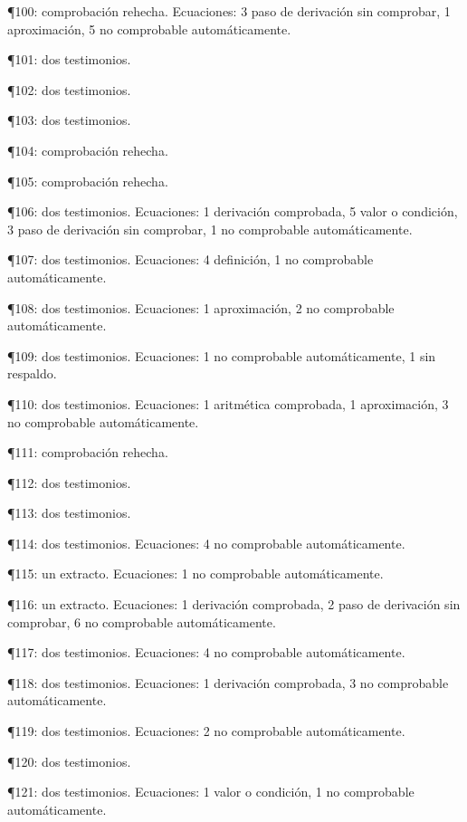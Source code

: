 \documentclass[10pt,openany]{book}
\begin{document}
\noindent ¶100: comprobación rehecha. Ecuaciones: 3 paso de derivación sin comprobar, 1 aproximación, 5 no comprobable automáticamente.\par
\noindent ¶101: dos testimonios.\par
\noindent ¶102: dos testimonios.\par
\noindent ¶103: dos testimonios.\par
\noindent ¶104: comprobación rehecha.\par
\noindent ¶105: comprobación rehecha.\par
\noindent ¶106: dos testimonios. Ecuaciones: 1 derivación comprobada, 5 valor o condición, 3 paso de derivación sin comprobar, 1 no comprobable automáticamente.\par
\noindent ¶107: dos testimonios. Ecuaciones: 4 definición, 1 no comprobable automáticamente.\par
\noindent ¶108: dos testimonios. Ecuaciones: 1 aproximación, 2 no comprobable automáticamente.\par
\noindent ¶109: dos testimonios. Ecuaciones: 1 no comprobable automáticamente, 1 sin respaldo.\par
\noindent ¶110: dos testimonios. Ecuaciones: 1 aritmética comprobada, 1 aproximación, 3 no comprobable automáticamente.\par
\noindent ¶111: comprobación rehecha.\par
\noindent ¶112: dos testimonios.\par
\noindent ¶113: dos testimonios.\par
\noindent ¶114: dos testimonios. Ecuaciones: 4 no comprobable automáticamente.\par
\noindent ¶115: un extracto. Ecuaciones: 1 no comprobable automáticamente.\par
\noindent ¶116: un extracto. Ecuaciones: 1 derivación comprobada, 2 paso de derivación sin comprobar, 6 no comprobable automáticamente.\par
\noindent ¶117: dos testimonios. Ecuaciones: 4 no comprobable automáticamente.\par
\noindent ¶118: dos testimonios. Ecuaciones: 1 derivación comprobada, 3 no comprobable automáticamente.\par
\noindent ¶119: dos testimonios. Ecuaciones: 2 no comprobable automáticamente.\par
\noindent ¶120: dos testimonios.\par
\noindent ¶121: dos testimonios. Ecuaciones: 1 valor o condición, 1 no comprobable automáticamente.\par
\end{document}
